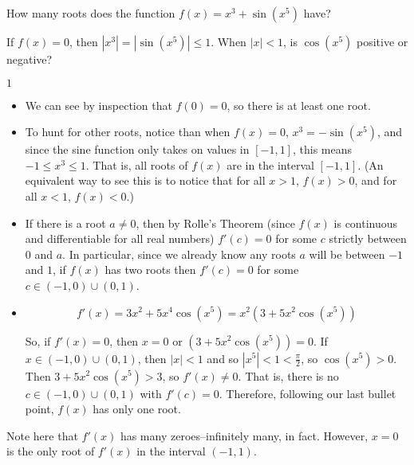 \begin{question}
How many roots does the function $f(x)=x^3+\sin\left(x^5\right)$ have?
\end{question}
\begin{hint}
If $f(x)=0$, then $|x^3|=\left|\sin\left(x^5\right)\right| \leq 1$. When $|x|<1$, is $\cos(x^5)$ positive or negative?
\end{hint}
\begin{answer}
$1$
\end{answer}
\begin{solution}
\begin{itemize}
\item We can see by inspection that $f(0)=0$, so there is at least one root.

\item To hunt for other roots, notice than when $f(x)=0$, $x^3=-\sin\left(x^5\right)$, and since the sine function only takes on values in $[-1,1]$, this means $-1 \leq x^3 \leq 1$. That is, all roots of $f(x)$ are in the interval $[-1,1]$. (An equivalent way to see this is to notice that for all $x >1$, $f(x)>0$, and for all $x<1$, $f(x)<0$.)

\item If there is a root $a \neq 0$, then by Rolle's Theorem (since $f(x)$ is continuous and differentiable for all real numbers) $f'(c)=0$ for some $c$ strictly between 0 and $a$. In particular, since we already know any roots $a$ will be between $-1$ and $1$, if $f(x)$ has two roots then $f'(c)=0$ for some $c \in (-1,0) \cup (0,1)$.

\item
\[f'(x)=3x^2+5x^4\cos\left(x^5\right)=x^2\left(3+5x^2\cos\left(x^5\right)\right)\]

So, if $f'(x)=0$, then $x=0$ or $\left(3+5x^2\cos\left(x^5\right)\right)=0$. If $x \in (-1,0) \cup (0,1)$, then $|x|<1$ and so $|x^5|<1<\frac{\pi}{2}$, so $\cos\left(x^5\right)>0$. Then $3+5x^2\cos\left(x^5\right) > 3$, so $f'(x) \neq 0$. That is, there is no $c \in (-1,0) \cup (0,1)$ with $f'(c)=0$. Therefore, following our last  bullet point, $f(x)$ has only one root.
\end{itemize}
Note here that $f'(x)$ has many zeroes--infinitely many, in fact. However, $x=0$ is the only root of $f'(x)$ in the interval $(-1,1)$.
\end{solution}


